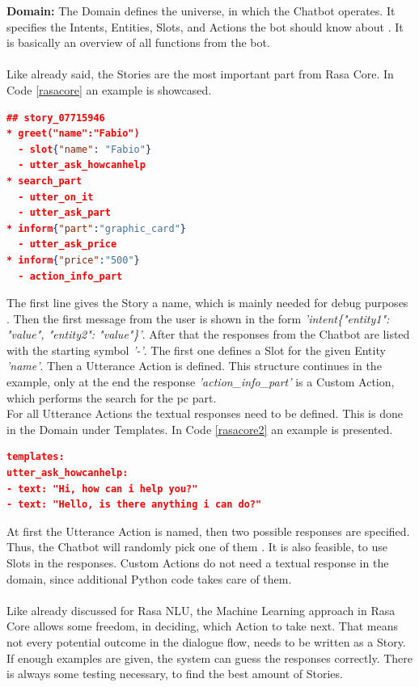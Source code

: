 \documentclass[10pt,final,journal,a4paper,oneside,twocolumn]{IEEEtran}
\begin{document}
\textbf{Domain:} The Domain defines the universe, in which the Chatbot operates. It specifies the Intents, Entities, Slots, and Actions the bot should know about \cite{b22}. It is basically an overview of all functions from the bot.\\
\\
Like already said, the Stories are the most important part from Rasa Core. In Code \ref{rasacore} an example is showcased.
\begin{lstlisting}[caption={Example for a Story in Rasa Core (based on \cite{b23}).}, label=rasacore, lineskip=1pt, language=json,
morekeywords={intent, search_part, inform, greet}]
## story_07715946
* greet("name":"Fabio")
  - slot{"name": "Fabio"}
  - utter_ask_howcanhelp
* search_part
  - utter_on_it
  - utter_ask_part
* inform{"part":"graphic_card"}
  - utter_ask_price
* inform{"price":"500"}
  - action_info_part
\end{lstlisting}
The first line gives the Story a name, which is mainly needed for debug purposes \cite{b23}. Then the first message from the user is shown in the form \textit{'intent\{"entity1": "value", "entity2": "value"\}'}. After that the responses from the Chatbot are listed with the starting symbol \textit{'-'}. The first one defines a Slot for the given Entity \textit{'name'}. Then a Utterance Action is defined. This structure continues in the example, only at the end the response \textit{'action\_info\_part'} is a Custom Action, which performs the search for the pc part.\\
For all Utterance Actions the textual responses need to be defined. This is done in the Domain under Templates. In Code \ref{rasacore2} an example is presented.
\begin{lstlisting}[caption={Example for templates in Rasa Core (based on \cite{b22}).}, label=rasacore2, lineskip=1pt, language=json,
morekeywords={templates}]
templates:
utter_ask_howcanhelp:
- text: "Hi, how can i help you?"
- text: "Hello, is there anything i can do?"
\end{lstlisting}
At first the Utterance Action is named, then two possible responses are specified. Thus, the Chatbot will randomly pick one of them \cite{b22}. It is also feasible, to use Slots in the responses. Custom Actions do not need a textual response in the domain, since additional Python code takes care of them.\\
\\
Like already discussed for Rasa NLU, the Machine Learning approach in Rasa Core allows some freedom, in deciding, which Action to take next. That means not every potential outcome in the dialogue flow, needs to be written as a Story. If enough examples are given, the system can guess the responses correctly. There is always some testing necessary, to find the best amount of Stories.
\end{document}
